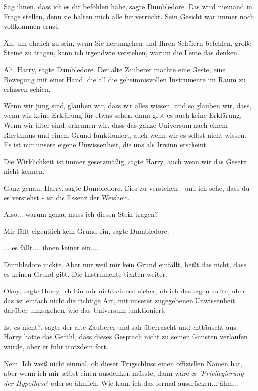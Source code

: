 \glqq Sag ihnen, dass ich es dir befohlen habe\grqq{}, sagte Dumbledore. \glqq
Das wird niemand in Frage stellen, denn sie halten mich alle für
verrückt.\grqq{} Sein Gesicht war immer noch vollkommen ernst.

\glqq Äh, um ehrlich zu sein, wenn Sie herumgehen und Ihren Schülern befehlen,
große Steine zu tragen, kann ich irgendwie verstehen, warum die Leute das
denken.\grqq{}

\glqq Ah, Harry\grqq{}, sagte Dumbledore. Der alte Zauberer machte eine Geste,
eine Bewegung mit einer Hand, die all die geheimnisvollen Instrumente im Raum zu
erfassen schien.

\glqq Wenn wir jung sind, glauben wir, dass wir alles wissen, und so glauben
wir, dass, wenn wir keine Erklärung für etwas sehen, dann gibt es auch keine
Erklärung. Wenn wir älter sind, erkennen wir, dass das ganze Universum nach
einem Rhythmus und einem Grund funktioniert, auch wenn wir es selbst nicht
wissen. Es ist nur unsere eigene Unwissenheit, die uns als Irrsinn
erscheint.\grqq{}

\glqq Die Wirklichkeit ist immer gesetzmäßig\grqq{}, sagte Harry, \glqq auch
wenn wir das Gesetz nicht kennen.\grqq{}

\glqq Ganz genau, Harry\grqq{}, sagte Dumbledore. \glqq Dies zu verstehen - und
ich sehe, dass du es verstehst - ist die Essenz der Weisheit.\grqq{}

\glqq Also... warum genau muss ich diesen Stein tragen?\grqq{}

\glqq Mir fällt eigentlich kein Grund ein\grqq{}, sagte Dumbledore.

\glqq ... es fällt.... ihnen keiner ein....\grqq{}

Dumbledore nickte. \glqq Aber nur weil mir kein Grund einfällt, heißt das nicht,
dass es keinen Grund gibt.\grqq{} Die Instrumente tickten weiter.

\glqq Okay\grqq{}, sagte Harry, \glqq ich bin mir nicht einmal sicher, ob ich
das sagen sollte, aber das ist einfach nicht die richtige Art, mit unserer
zugegebenen Unwissenheit darüber umzugehen, wie das Universum
funktioniert.\grqq{}

\glqq Ist es nicht?\grqq{}, sagte der alte Zauberer und sah überrascht und
enttäuscht aus. Harry hatte das Gefühl, dass dieses Gespräch nicht zu seinen
Gunsten verlaufen würde, aber er fuhr trotzdem fort.

\glqq Nein. Ich weiß nicht einmal, ob dieser Trugschluss einen offiziellen Namen
hat, aber wenn ich mir selbst einen ausdenken müsste, dann wäre es
\emph{'Privilegierung der Hypothese}' oder so ähnlich. Wie kann ich das formal
ausdrücken... ähm...

